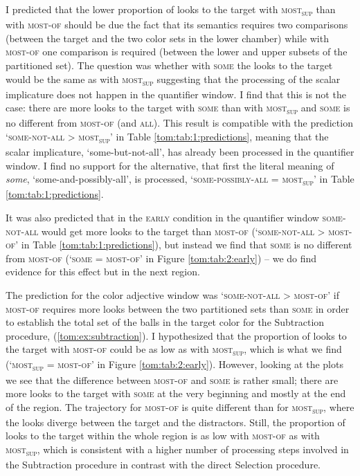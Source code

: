\documentclass[output=paper]{langscibook}
\begin{document}
I predicted that the lower proportion of looks to the target with \textsc{most\textsubscript{sup}} than with
\textsc{most-of} should be due the fact that its semantics requires two comparisons (between the target and the two
color sets in the lower chamber) while with \textsc{most-of} one comparison is required (between the lower and upper
subsets of the partitioned set). The question was whether with \textsc{some} the looks to the target would be the same
as with \textsc{most\textsubscript{sup}} suggesting that the processing of the scalar implicature does not happen in
the quantifier window. I find that this is not the case: there are more looks to the target with \textsc{some} than
with \textsc{most\textsubscript{sup}} and \textsc{some} is no different from \textsc{most-of} (and \textsc{all}). This
result is compatible with the prediction `\textsc{some-not-all} {\textgreater} \textsc{most\textsubscript{sup}}' in
Table \ref{tom:tab:1:predictions}, meaning that the scalar implicature, `some-but-not-all', has already been processed in the quantifier
window. I find no support for the alternative, that first the literal meaning of \textit{some}, `some-and-possibly-all', is processed, `\textsc{some-possibly-all} = \textsc{most\textsubscript{sup}}' in Table \ref{tom:tab:1:predictions}.

It was also predicted that in the \textsc{early} condition in the quantifier window \textsc{some-not-all} would get more looks to
the target than \textsc{most-of} (`\textsc{some-not-all} {\textgreater} \textsc{most-of}' in Table \ref{tom:tab:1:predictions}), but instead we
find that \textsc{some} is no different from \textsc{most-of} (`\textsc{some} = \textsc{most-of}' in Figure \ref{tom:tab:2:early}) – we do
find evidence for this effect but in the next region.

The prediction for the color adjective window was `\textsc{some-not-all} {\textgreater} \textsc{most-of}' if \textsc{most-of} requires more looks between the two partitioned sets than \textsc{some} in order to establish the total set of the balls in the target color for the Subtraction procedure, (\ref{tom:ex:subtraction}). I hypothesized that the proportion of looks to the target with
\textsc{most-of} could be as low as with \textsc{most\textsubscript{sup}}, which is what we find
(`\textsc{most\textsubscript{sup}} = \textsc{most-of}' in Figure \ref{tom:tab:2:early}). However, looking at the plots we see that the
difference between \textsc{most-of} and \textsc{some} is rather small; there are more looks to the target with \textsc{some} 
at the very beginning and mostly at the end of the region. The trajectory for \textsc{most-of} is quite different
than for \textsc{most\textsubscript{sup}}, where the looks diverge between the target and the distractors.
Still, the proportion of looks to the target within the whole region is as low with \textsc{most-of} as with
\textsc{most\textsubscript{sup}}, which is consistent with a higher number of processing steps involved in the
Subtraction procedure in contrast with the direct Selection procedure.
\end{document}
